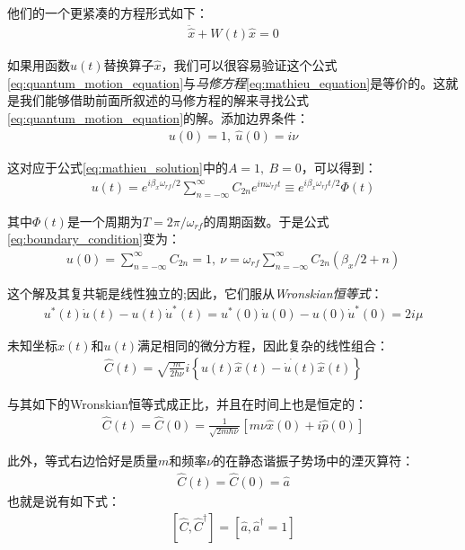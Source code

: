 他们的一个更紧凑的方程形式如下：
\begin{align}
    \ddot{\hat{x}}+W(t)\hat{x}=0 \label{eq:quantum_motion_equation}
\end{align}

如果用函数$u(t)$替换算子$\hat{x}$，我们可以很容易验证这个公式\eqref{eq:quantum_motion_equation}与\emph{马修方程}\eqref{eq:mathieu_equation}是等价的。这就是我们能够借助前面所叙述的马修方程的解来寻找公式\eqref{eq:quantum_motion_equation}的解。添加边界条件：
\begin{align}
    u(0)=1,\ \hat{u}(0)=i\nu \label{eq:boundary_condition}
\end{align}

这对应于公式\eqref{eq:mathieu_solution}中的$A=1,\ B=0$，可以得到：
\begin{align}
    u(t)=e^{i\beta_x\omega_{rf}/2}\sum_{n=-\infty}^{\infty} C_{2n}e^{i n\omega_{rf}t}\equiv e^{i\beta_x\omega_{rf}t/2}\Phi(t) \label{eq:ut_expression}
\end{align}

其中$\Phi(t)$是一个周期为$T=2\pi/\omega_{rf}$的周期函数。于是公式\eqref{eq:boundary_condition}变为：
\begin{align}
    u(0)=\sum_{n=-\infty}^{\infty}C_{2n}=1,\ \nu = \omega_{rf}\sum_{n=-\infty}^{\infty}C_{2n}(\beta_x/2+n)
\end{align}

这个解及其复共轭是线性独立的;因此，它们服从\emph{Wronskian恒等式}：
\begin{align}
    u^*(t)\dot{u}(t)-u(t)\dot{u}^*(t)=u^*(0)\dot{u}(0)-u(0)\dot{u}^*(0)=2 i \mu
\end{align}

未知坐标$\hat{x}(t)$和$u(t)$满足相同的微分方程，因此复杂的线性组合：
\begin{align}
    \hat{C}(t)=\sqrt{\frac{m}{2\hbar \nu}}i\left\{u(t)\dot{\hat{x}(t)-\dot{u}(t)\hat{x}(t)}\right\} \label{eq:complex_combination}
\end{align}

与其如下的Wronskian恒等式成正比，并且在时间上也是恒定的：
\begin{align}
    \hat{C}(t)=\hat{C}(0)=\frac{1}{\sqrt{2m \hbar \nu}}\left[m\nu\hat{x}(0)+i\hat{p}(0)\right]
\end{align}

此外，等式右边恰好是质量$m$和频率$\nu$的在静态谐振子势场中的湮灭算符：
\begin{align}
    \hat{C}(t)=\hat{C}(0)=\hat{a}
\end{align}
也就是说有如下式：
\begin{align}
    \left[\hat{C},\hat{C}^\dagger\right]=\left[\hat{a},\hat{a}^\dagger=1\right]
\end{align}

